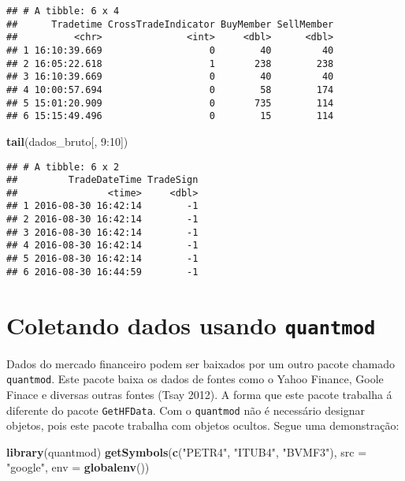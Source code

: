 \documentclass[]{article}
\newenvironment{Shaded}{\begin{snugshade}}{\end{snugshade}}
\newcommand{\KeywordTok}[1]{\textcolor[rgb]{0.13,0.29,0.53}{\textbf{{#1}}}}
\newcommand{\DataTypeTok}[1]{\textcolor[rgb]{0.13,0.29,0.53}{{#1}}}
\newcommand{\DecValTok}[1]{\textcolor[rgb]{0.00,0.00,0.81}{{#1}}}
\newcommand{\StringTok}[1]{\textcolor[rgb]{0.31,0.60,0.02}{{#1}}}
\newcommand{\NormalTok}[1]{{#1}}
\begin{document}
\begin{verbatim}
## # A tibble: 6 x 4
##      Tradetime CrossTradeIndicator BuyMember SellMember
##          <chr>               <int>     <dbl>      <dbl>
## 1 16:10:39.669                   0        40         40
## 2 16:05:22.618                   1       238        238
## 3 16:10:39.669                   0        40         40
## 4 10:00:57.694                   0        58        174
## 5 15:01:20.909                   0       735        114
## 6 15:15:49.496                   0        15        114
\end{verbatim}

\begin{Shaded}
\begin{Highlighting}[]
\KeywordTok{tail}\NormalTok{(dados_bruto[, }\DecValTok{9}\NormalTok{:}\DecValTok{10}\NormalTok{])}
\end{Highlighting}
\end{Shaded}

\begin{verbatim}
## # A tibble: 6 x 2
##         TradeDateTime TradeSign
##                <time>     <dbl>
## 1 2016-08-30 16:42:14        -1
## 2 2016-08-30 16:42:14        -1
## 3 2016-08-30 16:42:14        -1
## 4 2016-08-30 16:42:14        -1
## 5 2016-08-30 16:42:14        -1
## 6 2016-08-30 16:44:59        -1
\end{verbatim}

\section{\texorpdfstring{Coletando dados usando
\texttt{quantmod}}{Coletando dados usando quantmod}}\label{coletando-dados-usando-quantmod}

Dados do mercado financeiro podem ser baixados por um outro pacote
chamado \texttt{quantmod}. Este pacote baixa os dados de fontes como o
Yahoo Finance, Goole Finace e diversas outras fontes (Tsay 2012). A
forma que este pacote trabalha á diferente do pacote \texttt{GetHFData}.
Com o \texttt{quantmod} não é necessário designar objetos, pois este
pacote trabalha com objetos ocultos. Segue uma demonstração:

\begin{Shaded}
\begin{Highlighting}[]
\KeywordTok{library}\NormalTok{(quantmod)}
\KeywordTok{getSymbols}\NormalTok{(}\KeywordTok{c}\NormalTok{(}\StringTok{"PETR4"}\NormalTok{, }\StringTok{"ITUB4"}\NormalTok{, }\StringTok{"BVMF3"}\NormalTok{), }\DataTypeTok{src =} \StringTok{"google"}\NormalTok{, }\DataTypeTok{env =} \KeywordTok{globalenv}\NormalTok{())}
\end{Highlighting}
\end{Shaded}
\end{document}
